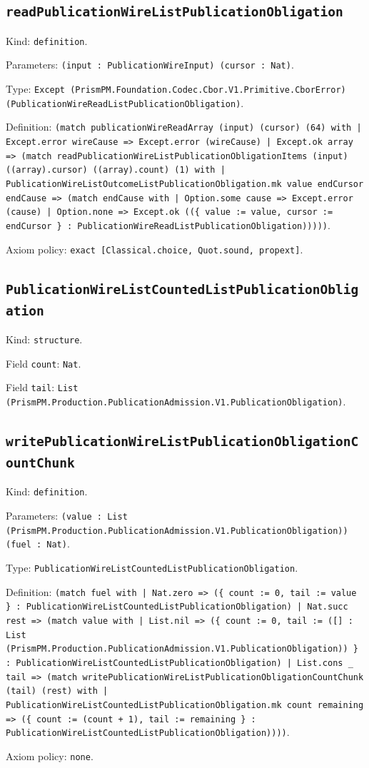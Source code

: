 \documentclass[11pt]{article}
\begin{document}
\subsection*{\texttt{readPublicationWireListPublicationObligation}}
\noindent Kind: \texttt{definition}.\par
\noindent Parameters: \texttt{(input : PublicationWireInput) (cursor : Nat)}.\par
\noindent Type: \texttt{Except (PrismPM.Foundation.Codec.Cbor.V1.Primitive.CborError) (PublicationWireReadListPublicationObligation)}.\par
\noindent Definition: \texttt{(match publicationWireReadArray (input) (cursor) (64) with | Except.error wireCause => Except.error (wireCause) | Except.ok array => (match readPublicationWireListPublicationObligationItems (input) ((array).cursor) ((array).count) (1) with | PublicationWireListOutcomeListPublicationObligation.mk value endCursor endCause => (match endCause with | Option.some cause => Except.error (cause) | Option.none => Except.ok ((\{ value := value, cursor := endCursor \} : PublicationWireReadListPublicationObligation)))))}.\par
\noindent Axiom policy: \texttt{exact [Classical.choice, Quot.sound, propext]}.\par
\subsection*{\texttt{PublicationWireListCountedListPublicationObligation}}
\noindent Kind: \texttt{structure}.\par
\noindent Field \texttt{count}: \texttt{Nat}.\par
\noindent Field \texttt{tail}: \texttt{List (PrismPM.Production.PublicationAdmission.V1.PublicationObligation)}.\par
\subsection*{\texttt{writePublicationWireListPublicationObligationCountChunk}}
\noindent Kind: \texttt{definition}.\par
\noindent Parameters: \texttt{(value : List (PrismPM.Production.PublicationAdmission.V1.PublicationObligation)) (fuel : Nat)}.\par
\noindent Type: \texttt{PublicationWireListCountedListPublicationObligation}.\par
\noindent Definition: \texttt{(match fuel with | Nat.zero => (\{ count := 0, tail := value \} : PublicationWireListCountedListPublicationObligation) | Nat.succ rest => (match value with | List.nil => (\{ count := 0, tail := ([] : List (PrismPM.Production.PublicationAdmission.V1.PublicationObligation)) \} : PublicationWireListCountedListPublicationObligation) | List.cons \_ tail => (match writePublicationWireListPublicationObligationCountChunk (tail) (rest) with | PublicationWireListCountedListPublicationObligation.mk count remaining => (\{ count := (count + 1), tail := remaining \} : PublicationWireListCountedListPublicationObligation))))}.\par
\noindent Axiom policy: \texttt{none}.\par
\end{document}
